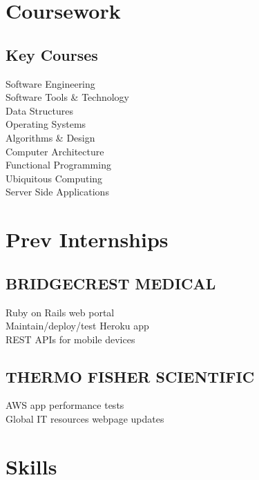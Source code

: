 \documentclass[]{deedy-resume-openfont}
\begin{document}
\begin{minipage}[t]{0.33\textwidth}

\section{Coursework}
\subsection{Key Courses}
Software Engineering \\
Software Tools \& Technology \\
Data Structures \\
Operating Systems \\
Algorithms \& Design \\
Computer Architecture \\
Functional Programming \\
Ubiquitous Computing \\
Server Side Applications \\
\sectionsep


\section{Prev Internships}
\subsection{BRIDGECREST MEDICAL}
\textbullet{} Ruby on Rails web portal \\
\textbullet{} Maintain/deploy/test Heroku app \\
\textbullet{} REST APIs for mobile devices \\
\sectionsep
\subsection{THERMO FISHER SCIENTIFIC}
\textbullet{} AWS app performance tests \\
\textbullet{} Global IT resources webpage updates


\section{Skills}

\end{minipage}
\end{document}
